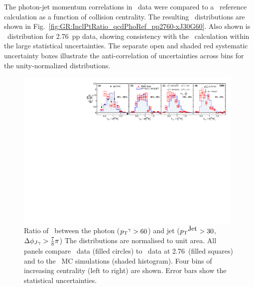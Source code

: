 The photon-jet momentum correlations in \PbPb\ data were compared to a \PYTHYD\ reference 
calculation as a function of collision centrality. The resulting 
\xjg\ distributions are shown in Fig.~\ref{fig:GR:InclPtRatio_qcdPhoRef_pp2760-xJ30G60}.
Also shown is \avexjg\ distribution for 2.76\TeV\ pp data, showing consistency 
with the \PYTHYD\ calculation within the large statistical uncertainties.
The separate open and shaded red systematic uncertainty boxes illustrate the 
anti-correlation of uncertainties across bins for the unity-normalized distributions.

\begin{figure}[!h]
\begin{center}
\includegraphics[width=0.98\textwidth]{jetfigures/Photonv7_Paper_InclPtRatio_all_cent4_G60J30_subDPhi1SS1_Isol0_Norm1log1.pdf}
\caption[]{\label{fig:GR:InclPtRatio_qcdPhoRef_pp2760-xJ30G60} Ratio of \pT\ between the
  photon ($\mbox{$p_{\mathrm{T}}$}^{\gamma} > 60$\GeVc) and jet ($\mbox{$p_{\mathrm{T}}$}^{\mbox{Jet}} > 30$\GeVc, $\Delta\phi_{J\gamma} > \frac{7}{8}\pi$)
  The distributions are normalised to unit area. All panels compare
\PbPb\ data (filled circles) to \pp\ data at
  2.76\TeV\ (filled squares) and to the \PYTHYD\ MC simulations
  (shaded histogram). Four bins of increasing centrality (left to right) are shown. 
Error bars show the statistical uncertainties.
}
\label{fig:GR:CMS_xjg}
\end{center}
\end{figure}

